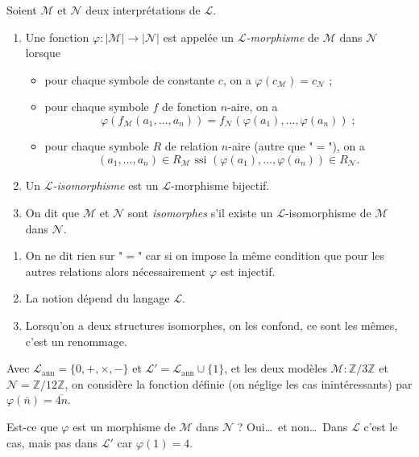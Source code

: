 \documentclass[./main]{subfiles}
\begin{document}
  \begin{defn}
    Soient $\mathcal{M}$ et $\mathcal{N}$ deux interprétations de $\mathcal{L}$.
    \begin{enumerate}
      \item Une fonction $\varphi : |\mathcal{M}| \to |\mathcal{N}|$ est appelée un \textit{$\mathcal{L}$-morphisme} de $\mathcal{M}$ dans $\mathcal{N}$ lorsque
        \begin{itemize}
          \item pour chaque symbole de constante $c$, on a $\varphi(c_{\mathcal{M}}) = c_{\mathcal{N}}$ ;
          \item pour chaque symbole $f$ de fonction $n$-aire, on a 
            \[
            \varphi(f_{\mathcal{M}}(a_1, \ldots, a_n)) = f_{\mathcal{N}}(\varphi(a_1), \ldots, \varphi(a_n))\;
            ;\] 
          \item pour chaque symbole $R$ de relation $n$-aire (autre que "$=$"), on a 
            \[
              (a_1, \ldots, a_n) \in R_{\mathcal{M}} \text{ ssi } (\varphi(a_1), \ldots, \varphi(a_n)) \in R_{\mathcal{N}}
            .\]
        \end{itemize}
      \item Un \textit{$\mathcal{L}$-isomorphisme} est un $\mathcal{L}$-morphisme bijectif.
      \item On dit que $\mathcal{M}$ et $\mathcal{N}$ sont \textit{isomorphes} s'il existe un $\mathcal{L}$-isomorphisme de $\mathcal{M}$ dans $\mathcal{N}$.
    \end{enumerate}
  \end{defn}

  \begin{rmk}
    \begin{enumerate}
      \item On ne dit rien sur "$=$" car si on impose la même condition que pour les autres relations alors nécessairement $\varphi$ est injectif.
      \item La notion dépend du langage $\mathcal{L}$.
      \item Lorsqu'on a deux structures isomorphes, on les confond, ce sont les mêmes, c'est un renommage.
    \end{enumerate}
  \end{rmk}

  \begin{exm}
    Avec $\mathcal{L}_\mathrm{ann} = \{0, +, \times ,-\}$ et $\mathcal{L}' = \mathcal{L}_\mathrm{ann}\cup  \{1\}$, et les deux modèles $\mathcal{M} : \mathds{Z} / 3\mathds{Z}$ et $\mathcal{N} = \mathds{Z} / 12 \mathds{Z}$, on considère la fonction définie (on néglige les cas inintéressants) par $\varphi(\bar{n}) = \overline{4n}$.

    Est-ce que $\varphi$ est un morphisme de $\mathcal{M}$ dans $\mathcal{N}$ ? Oui\ldots\ et non\ldots\ Dans $\mathcal{L}$ c'est le cas, mais pas dans $\mathcal{L}'$  car $\varphi(1) = 4$.
  \end{exm}
\end{document}
